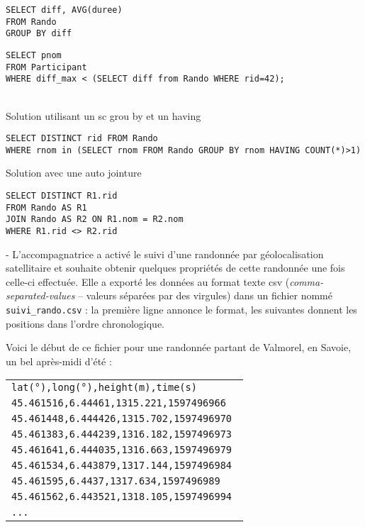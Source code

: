 \documentclass[11pt,a4paper]{article}
\begin{document}
\begin{Exercise}[title={Randonnée},origin={\bac \; d'après {\sc ccmp 2021 - pc, pc psi} (Partie 1)}]
	\begin{verbatim}
SELECT diff, AVG(duree)
FROM Rando 
GROUP BY diff
	\end{verbatim}
	\begin{verbatim}
SELECT pnom 
FROM Participant 
WHERE diff_max < (SELECT diff from Rando WHERE rid=42);
	\end{verbatim}
	\\
Solution utilisant un {sc grou by} et un {\sc having}
	\begin{verbatim}
SELECT DISTINCT rid FROM Rando
WHERE rnom in (SELECT rnom FROM Rando GROUP BY rnom HAVING COUNT(*)>1)
\end{verbatim}
Solution avec une auto jointure
\begin{verbatim}
SELECT DISTINCT R1.rid 
FROM Rando AS R1
JOIN Rando AS R2 ON R1.nom = R2.nom
WHERE R1.rid <> R2.rid
\end{verbatim}
\medskip 
\leftskip -\QuestionIndent
L'accompagnatrice a activé le suivi d'une randonnée par géolocalisation satellitaire et souhaite obtenir quelques propriétés de cette randonnée une fois celle-ci effectuée. Elle a exporté les données au format texte {\sc csv} (\textit{comma-separated-values} -- valeurs séparées par des virgules) dans un fichier nommé {\tt suivi\_rando.csv} : la première ligne annonce le format, les suivantes donnent les positions dans l'ordre chronologique.

Voici le début de ce fichier pour une randonnée partant de Valmorel, en Savoie, un bel après-midi d'été :

\begin{center}
	\begin{tabular}{>{\tt}l}
lat(°),long(°),height(m),time(s) \\
45.461516,6.44461,1315.221,1597496966 \\
45.461448,6.444426,1315.702,1597496970 \\
45.461383,6.444239,1316.182,1597496973  \\
45.461641,6.444035,1316.663,1597496979 \\
45.461534,6.443879,1317.144,1597496984 \\
45.461595,6.4437,1317.634,1597496989 \\
45.461562,6.443521,1318.105,1597496994 \\
... \\
	\end{tabular}
\end{center}


\end{Exercise}
\end{document}

